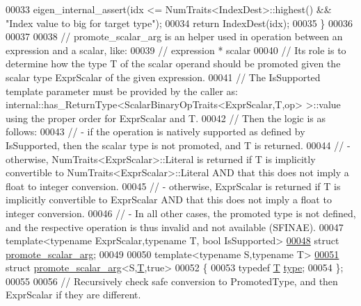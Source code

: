 \begin{DoxyCode}
00033   eigen\_internal\_assert(idx <= NumTraits<IndexDest>::highest() && \textcolor{stringliteral}{"Index value to big for target type"});
00034   \textcolor{keywordflow}{return} IndexDest(idx);
00035 \}
00036 
00037 
00038 \textcolor{comment}{// promote\_scalar\_arg is an helper used in operation between an expression and a scalar, like:}
00039 \textcolor{comment}{//    expression * scalar}
00040 \textcolor{comment}{// Its role is to determine how the type T of the scalar operand should be promoted given the scalar type
       ExprScalar of the given expression.}
00041 \textcolor{comment}{// The IsSupported template parameter must be provided by the caller as:
       internal::has\_ReturnType<ScalarBinaryOpTraits<ExprScalar,T,op> >::value using the proper order for ExprScalar and T.}
00042 \textcolor{comment}{// Then the logic is as follows:}
00043 \textcolor{comment}{//  - if the operation is natively supported as defined by IsSupported, then the scalar type is not
       promoted, and T is returned.}
00044 \textcolor{comment}{//  - otherwise, NumTraits<ExprScalar>::Literal is returned if T is implicitly convertible to
       NumTraits<ExprScalar>::Literal AND that this does not imply a float to integer conversion.}
00045 \textcolor{comment}{//  - otherwise, ExprScalar is returned if T is implicitly convertible to ExprScalar AND that this does not
       imply a float to integer conversion.}
00046 \textcolor{comment}{//  - In all other cases, the promoted type is not defined, and the respective operation is thus invalid
       and not available (SFINAE).}
00047 \textcolor{keyword}{template}<\textcolor{keyword}{typename} ExprScalar,\textcolor{keyword}{typename} T, \textcolor{keywordtype}{bool} IsSupported>
\hyperlink{struct_eigen_1_1internal_1_1promote__scalar__arg}{00048} \textcolor{keyword}{struct }\hyperlink{struct_eigen_1_1internal_1_1promote__scalar__arg}{promote\_scalar\_arg};
00049 
00050 \textcolor{keyword}{template}<\textcolor{keyword}{typename} S,\textcolor{keyword}{typename} T>
\hyperlink{struct_eigen_1_1internal_1_1promote__scalar__arg_3_01_s_00_01_t_00_01true_01_4}{00051} \textcolor{keyword}{struct }\hyperlink{struct_eigen_1_1internal_1_1promote__scalar__arg}{promote\_scalar\_arg}<S,\hyperlink{group___sparse_core___module}{T},true>
00052 \{
00053   \textcolor{keyword}{typedef} \hyperlink{group___sparse_core___module}{T} \hyperlink{group___sparse_core___module}{type};
00054 \};
00055 
00056 \textcolor{comment}{// Recursively check safe conversion to PromotedType, and then ExprScalar if they are different.}

\end{DoxyCode}
